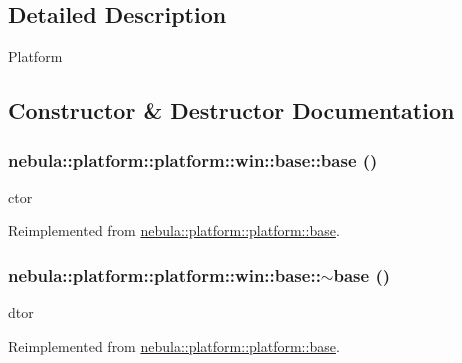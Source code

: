 \subsection{Detailed Description}
Platform 

\subsection{Constructor \& Destructor Documentation}
\hypertarget{classnebula_1_1platform_1_1platform_1_1win_1_1base_a80a1eae8a99db4680430cd473a4be9e7}{
\subsubsection[{base}]{\setlength{\rightskip}{0pt plus 5cm}nebula::platform::platform::win::base::base ()}}
\label{classnebula_1_1platform_1_1platform_1_1win_1_1base_a80a1eae8a99db4680430cd473a4be9e7}
ctor 

Reimplemented from \hyperlink{classnebula_1_1platform_1_1platform_1_1base_ab5473b3326da0afc860eec802b01fcf8}{nebula::platform::platform::base}.\hypertarget{classnebula_1_1platform_1_1platform_1_1win_1_1base_ae3b97a8472033fe4b4067a783c440c18}{
\subsubsection[{$\sim$base}]{\setlength{\rightskip}{0pt plus 5cm}nebula::platform::platform::win::base::$\sim$base ()}}
\label{classnebula_1_1platform_1_1platform_1_1win_1_1base_ae3b97a8472033fe4b4067a783c440c18}
dtor 

Reimplemented from \hyperlink{classnebula_1_1platform_1_1platform_1_1base_af06e978c1a4676fb040758a35a8c2ea1}{nebula::platform::platform::base}.

